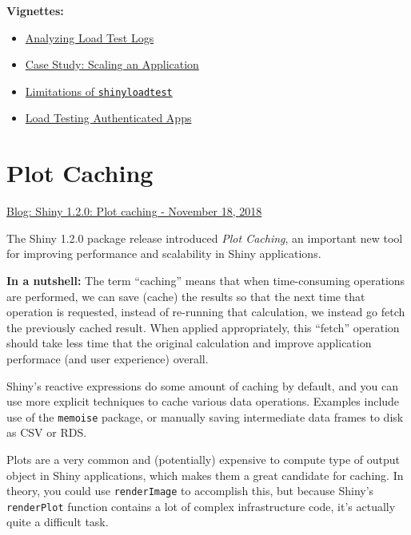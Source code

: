 \documentclass[]{book}
\providecommand{\tightlist}{%
  \setlength{\itemsep}{0pt}\setlength{\parskip}{0pt}}
\theoremstyle{definition}
\theoremstyle{definition}
\theoremstyle{definition}
\theoremstyle{remark}
\begin{document}
\textbf{Vignettes:}

\begin{itemize}
\tightlist
\item
  \href{https://rstudio.github.io/shinyloadtest/articles/analyzing-load-test-logs.html}{Analyzing
  Load Test Logs}
\item
  \href{https://rstudio.github.io/shinyloadtest/articles/case-study-scaling.html}{Case
  Study: Scaling an Application}
\item
  \href{https://rstudio.github.io/shinyloadtest/articles/limitations-of-shinyloadtest.html}{Limitations
  of \texttt{shinyloadtest}}
\item
  \href{https://rstudio.github.io/shinyloadtest/articles/load-testing-authenticated-apps.html}{Load
  Testing Authenticated Apps}
\end{itemize}

\hypertarget{plot-caching}{%
\chapter{Plot Caching}\label{plot-caching}}

\href{https://resources.rstudio.com/rstudio-blog/shiny-1-2-0-plot-caching}{Blog:
Shiny 1.2.0: Plot caching - November 18, 2018}

The Shiny 1.2.0 package release introduced \emph{Plot Caching}, an
important new tool for improving performance and scalability in Shiny
applications.

\textbf{In a nutshell:} The term ``caching'' means that when
time-consuming operations are performed, we can save (cache) the results
so that the next time that operation is requested, instead of re-running
that calculation, we instead go fetch the previously cached result. When
applied appropriately, this ``fetch'' operation should take less time
that the original calculation and improve application performace (and
user experience) overall.

Shiny's reactive expressions do some amount of caching by default, and
you can use more explicit techniques to cache various data operations.
Examples include use of the \texttt{memoise} package, or manually saving
intermediate data frames to disk as CSV or RDS.

Plots are a very common and (potentially) expensive to compute type of
output object in Shiny applications, which makes them a great candidate
for caching. In theory, you could use \texttt{renderImage} to accomplish
this, but because Shiny's \texttt{renderPlot} function contains a lot of
complex infrastructure code, it's actually quite a difficult task.
\end{document}
